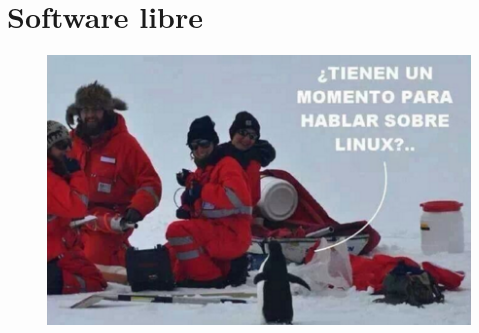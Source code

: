 \documentclass[spanish]{beamer}
\begin{document}
\section{Software libre}
\begin{frame}
	\begin{figure}
		\centering
		\includegraphics[width=0.9\linewidth]{tux-evang}
	\end{figure}
\end{frame}
\end{document}
